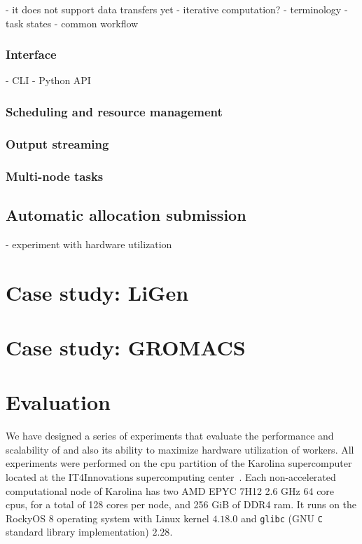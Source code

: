 - it does not support data transfers yet
- iterative computation?
- terminology
- task states
- common workflow

\subsubsection{Interface}
- CLI
- Python API

\subsubsection{Scheduling and resource management}

\subsubsection{Output streaming}

\subsubsection{Multi-node tasks}

\subsection{Automatic allocation submission}
- experiment with hardware utilization

\section{Case study: LiGen}

\section{Case study: GROMACS}

\section{Evaluation}
We have designed a series of experiments that evaluate the performance and scalability of
\hyperqueue{} and also its ability to maximize hardware utilization of workers. All
experiments were performed on the \gls{cpu} partition of the Karolina
supercomputer~\cite{karolina} located at the IT4Innovations supercomputing
center~\cite{it4i}. Each non-accelerated computational node of Karolina has two AMD
EPYC\texttrademark{} 7H12 2.6 GHz 64 core \glspl{cpu}, for a total of 128 cores per
node, and 256 GiB of DDR4 \gls{ram}. It runs on the RockyOS 8 operating system with Linux kernel
$4.18.0$ and \texttt{glibc} (GNU \texttt{C} standard library implementation) $2.28$.


